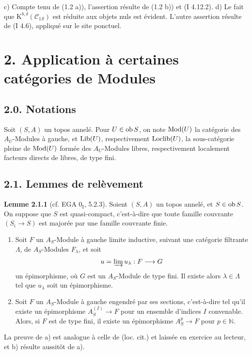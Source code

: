 \documentclass[11pt]{article}
\begin{document}
c) Compte tenu de (1.2 a)), l'assertion résulte de (1.2 b)) et (I 4.12.2). d) Le fait que $\mathrm K^{b,\delta}(\mathcal C_{1S})$ est réduite aux objets nuls est évident. L'autre assertion résulte de (I 4.6), appliqué sur le site ponctuel.

\section*{2. Application à certaines catégories de Modules}
\subsection*{2.0. Notations}
Soit $(S,A)$ un topos annelé. Pour $U\in\operatorname{ob} S$, on note $\operatorname{Mod}(U)$ la catégorie des $A_U$-Modules à gauche, et $\operatorname{Lib}(U)$, respectivement $\operatorname{Loclib}(U)$, la sous-catégorie pleine de $\operatorname{Mod}(U)$ formée des $A_U$-Modules libres, respectivement localement facteurs directs de libres, de type fini.

\subsection*{2.1. Lemmes de relèvement}

\textbf{Lemme 2.1.1} (cf. EGA $0_{\mathrm I}$, 5.2.3). Soient $(S,A)$ un topos annelé, et $S\in\operatorname{ob} S$. On suppose que $S$ est quasi-compact, c'est-à-dire que toute famille couvrante $(S_i\to S)$ est majorée par une famille couvrante finie.
\begin{enumerate}[label=\alph*)]
\item Soit $F$ un $A_S$-Module à gauche limite inductive, suivant une catégorie filtrante $\Lambda$, de $A_S$-Modules $F_\lambda$, et soit
\[
u=\varinjlim u_\lambda:F\longrightarrow G
\]
un épimorphisme, où $G$ est un $A_S$-Module de type fini. Il existe alors $\lambda\in\Lambda$ tel que $u_\lambda$ soit un épimorphisme.
\item Soit $F$ un $A_S$-Module à gauche engendré par ses sections, c'est-à-dire tel qu'il existe un épimorphisme $A_S^{(I)}\to F$ pour un ensemble d'indices $I$ convenable. Alors, si $F$ est de type fini, il existe un épimorphisme $A_S^p\to F$ pour $p\in\mathbb N$.
\end{enumerate}
La preuve de a) est analogue à celle de (loc. cit.) et laissée en exercice au lecteur, et b) résulte aussitôt de a).
\end{document}
